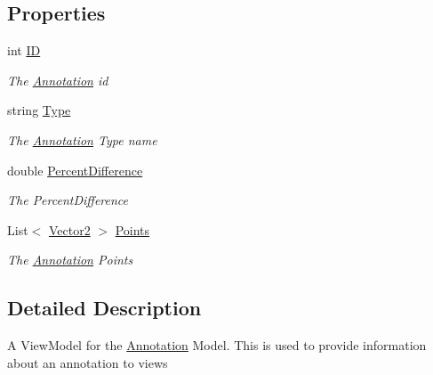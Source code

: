 \subsection*{Properties}
\begin{DoxyCompactItemize}
\item 
int \mbox{\hyperlink{class_eagle_eye_1_1_views_1_1_parking_lot_1_1_annotation_a2030e36f1aaa354132b808601261ca59}{ID}}
\begin{DoxyCompactList}\small\item\em The \mbox{\hyperlink{class_eagle_eye_1_1_views_1_1_parking_lot_1_1_annotation}{Annotation}} id \end{DoxyCompactList}\item 
string \mbox{\hyperlink{class_eagle_eye_1_1_views_1_1_parking_lot_1_1_annotation_a90963e9e05db4da561e03dcea8cf1c8e}{Type}}
\begin{DoxyCompactList}\small\item\em The \mbox{\hyperlink{class_eagle_eye_1_1_views_1_1_parking_lot_1_1_annotation}{Annotation}} Type name \end{DoxyCompactList}\item 
double \mbox{\hyperlink{class_eagle_eye_1_1_views_1_1_parking_lot_1_1_annotation_ac5253d379e1c453fd5344d63624fc4ed}{Percent\+Difference}}
\begin{DoxyCompactList}\small\item\em The Percent\+Difference \end{DoxyCompactList}\item 
List$<$ \mbox{\hyperlink{class_eagle_eye_1_1_views_1_1_parking_lot_1_1_vector2}{Vector2}} $>$ \mbox{\hyperlink{class_eagle_eye_1_1_views_1_1_parking_lot_1_1_annotation_a7f931393cb52e90a6eca3ceb7ba8dad9}{Points}}
\begin{DoxyCompactList}\small\item\em The \mbox{\hyperlink{class_eagle_eye_1_1_views_1_1_parking_lot_1_1_annotation}{Annotation}} Points \end{DoxyCompactList}\end{DoxyCompactItemize}


\subsection{Detailed Description}
A View\+Model for the \mbox{\hyperlink{class_eagle_eye_1_1_views_1_1_parking_lot_1_1_annotation}{Annotation}} Model. This is used to provide information about an annotation to views 



